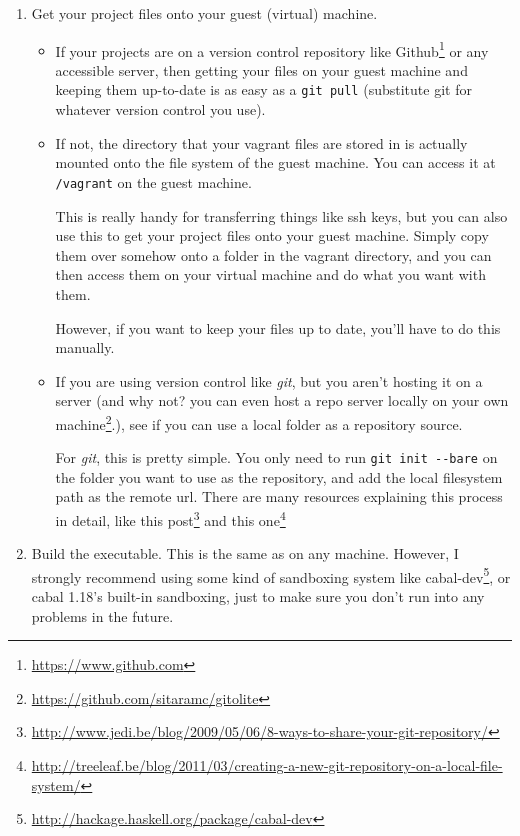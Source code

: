 \documentclass[]{article}
\renewcommand{\href}[2]{#2\footnote{\url{#1}}}
\begin{document}
\begin{enumerate}
\def\labelenumi{\arabic{enumi}.}
\item
  Get your project files onto your guest (virtual) machine.

  \begin{itemize}
  \item
    If your projects are on a version control repository like
    \href{https://www.github.com}{Github} or any accessible server, then getting
    your files on your guest machine and keeping them up-to-date is as easy as a
    \texttt{git\ pull} (substitute git for whatever version control you use).
  \item
    If not, the directory that your vagrant files are stored in is actually
    mounted onto the file system of the guest machine. You can access it at
    \texttt{/vagrant} on the guest machine.

    This is really handy for transferring things like ssh keys, but you can also
    use this to get your project files onto your guest machine. Simply copy them
    over somehow onto a folder in the vagrant directory, and you can then access
    them on your virtual machine and do what you want with them.

    However, if you want to keep your files up to date, you'll have to do this
    manually.
  \item
    If you are using version control like \emph{git}, but you aren't hosting it
    on a server (and why not? you can even
    \href{https://github.com/sitaramc/gitolite}{host a repo server locally on
    your own machine}.), see if you can use a local folder as a repository
    source.

    For \emph{git}, this is pretty simple. You only need to run
    \texttt{git\ init\ -\/-bare} on the folder you want to use as the
    repository, and add the local filesystem path as the remote url. There are
    many resources explaining this process in detail, like
    \href{http://www.jedi.be/blog/2009/05/06/8-ways-to-share-your-git-repository/}{this
    post} and
    \href{http://treeleaf.be/blog/2011/03/creating-a-new-git-repository-on-a-local-file-system/}{this
    one}
  \end{itemize}
\item
  Build the executable. This is the same as on any machine. However, I strongly
  recommend using some kind of sandboxing system like
  \href{http://hackage.haskell.org/package/cabal-dev}{cabal-dev}, or cabal
  1.18's built-in sandboxing, just to make sure you don't run into any problems
  in the future.


\end{enumerate}
\end{document}
